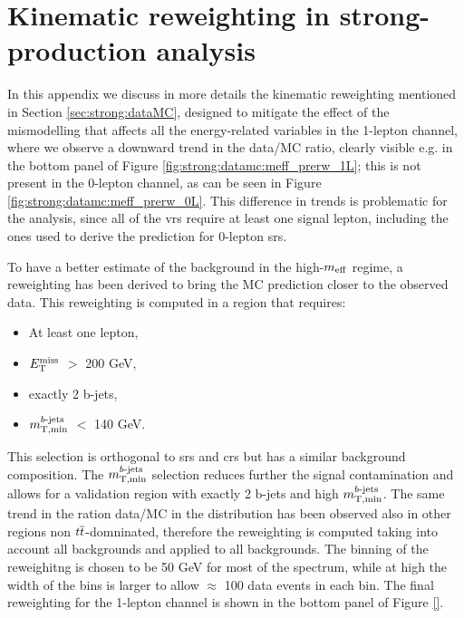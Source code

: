 \chapter{Kinematic reweighting in strong-production analysis}
\label{app:meffrw}

In this appendix we discuss in more details the kinematic reweighting mentioned in Section \ref{sec:strong:dataMC},
designed to mitigate the effect of the mismodelling that affects all the energy-related variables in the 1-lepton channel,
where we observe a downward trend in the data/MC ratio, clearly visible e.g. in the bottom panel of 
Figure \ref{fig:strong:datamc:meff_prerw_1L}; this is not present in the 0-lepton channel, as can be seen in 
Figure \ref{fig:strong:datamc:meff_prerw_0L}.
This difference in trends is problematic for the analysis, since all of the \glspl{vr} require at least one signal lepton, 
including the ones used to derive the prediction for 0-lepton \glspl{sr}.

To have a better estimate of the background in the high-$m_{\mathrm{eff}}$ regime, a reweighting has been derived to bring the MC prediction closer to the observed data. This reweighting is computed in a region that requires:
\begin{itemize}
\item At least one lepton,
\item $E_{\rm T}^{\mathrm{miss}}$ $>$ 200 GeV,
\item exactly 2 b-jets,
\item $m_{\mathrm{T, min}}^{b\textrm{-jets}}$ $<$ 140 GeV.
\end{itemize}

This selection is orthogonal to \glspl{sr} and \glspl{cr} but has a similar background composition. 
The $m_{\mathrm{T, min}}^{b\textrm{-jets}}$ selection reduces further the signal contamination and allows for a validation region with exactly 2 b-jets and high $m_{\mathrm{T, min}}^{b\textrm{-jets}}$. 
The same trend in the ration data/MC in the \meff distribution has been observed also in other regions non $t\overline{t}$-domninated,
therefore the reweighting is computed taking into account all backgrounds and applied to all backgrounds. 
The binning of the reweighitng is chosen to be 50 GeV for most of the \meff spectrum, 
while at high \meff the width of the bins is larger to allow $\approx$ 100 data events in each bin. 
The final reweighting for the 1-lepton channel is shown in the bottom panel of Figure \ref{}.